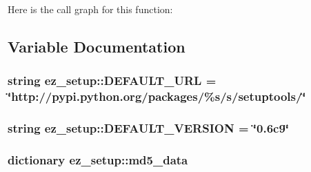 \-Here is the call graph for this function\-:




\subsection{\-Variable \-Documentation}
\hypertarget{namespaceez__setup_acb0ebf8437227029f912f8608888d3ab}{
\subsubsection[{\-D\-E\-F\-A\-U\-L\-T\-\_\-\-U\-R\-L}]{\setlength{\rightskip}{0pt plus 5cm}string {\bf ez\-\_\-setup\-::\-D\-E\-F\-A\-U\-L\-T\-\_\-\-U\-R\-L} = \char`\"{}http\-://pypi.\-python.\-org/packages/\%s/s/setuptools/\char`\"{}}}\label{namespaceez__setup_acb0ebf8437227029f912f8608888d3ab}
\hypertarget{namespaceez__setup_ab73a46fbe5deb3770b318dc24d185db4}{
\subsubsection[{\-D\-E\-F\-A\-U\-L\-T\-\_\-\-V\-E\-R\-S\-I\-O\-N}]{\setlength{\rightskip}{0pt plus 5cm}string {\bf ez\-\_\-setup\-::\-D\-E\-F\-A\-U\-L\-T\-\_\-\-V\-E\-R\-S\-I\-O\-N} = \char`\"{}0.\-6c9\char`\"{}}}\label{namespaceez__setup_ab73a46fbe5deb3770b318dc24d185db4}
\hypertarget{namespaceez__setup_ad479fbda506c99dd951a86881ef69d07}{
\subsubsection[{md5\-\_\-data}]{\setlength{\rightskip}{0pt plus 5cm}dictionary {\bf ez\-\_\-setup\-::md5\-\_\-data}}}\label{namespaceez__setup_ad479fbda506c99dd951a86881ef69d07}
